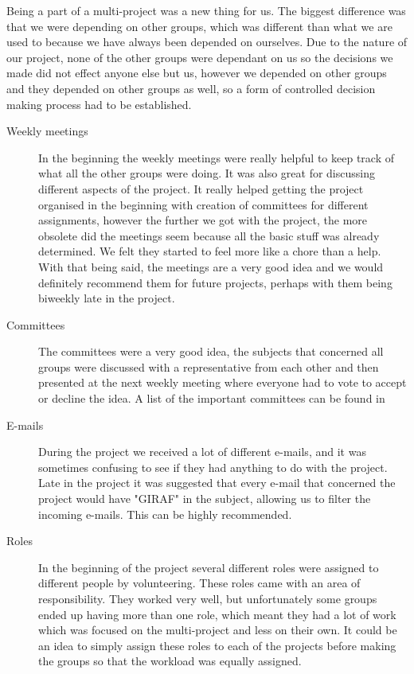 Being a part of a multi-project was a new thing for us. The biggest difference was that we were depending on other groups, which was different than what we are used to because we have always been depended on ourselves. Due to the nature of our project, none of the other groups were dependant on us so the decisions we made did not effect anyone else but us, however we depended on other groups and they depended on other groups as well, so a form of controlled decision making process had to be established. 

\begin{description}
\item[Weekly meetings]In the beginning the weekly meetings  were really helpful to keep track of what all the other groups were doing. It was also great for discussing different aspects of the project. It really helped getting the project organised in the beginning with creation of committees for different assignments, however the further we got with the project, the more obsolete did the meetings seem because all the basic stuff was already determined. We felt they started to feel more like a chore than a help. With that being said, the meetings are a very good idea and we would definitely recommend them for future projects, perhaps with them being biweekly late in the project. 

\item[Committees] The committees were a very good idea, the subjects that concerned all groups were discussed with a representative from each other and then presented at the next weekly meeting where everyone had to vote to accept or decline the idea. A list of the important committees can be found in 

\item[E-mails] During the project we received a lot of different e-mails, and it was sometimes confusing to see if they had anything to do with the project. Late in the project it was suggested that every e-mail that concerned the project would have "GIRAF" in the subject, allowing us to filter the incoming e-mails. This can be highly recommended. 

\item[Roles] In the beginning of the project several different roles were assigned to different people by volunteering. These roles came with an area of responsibility. They worked very well, but unfortunately some groups ended up having more than one role, which meant they had a lot of work which was focused on the multi-project and less on their own. It could be an idea to simply assign these roles to each of the projects before making the groups so that the workload was equally assigned. 
\end{description}

